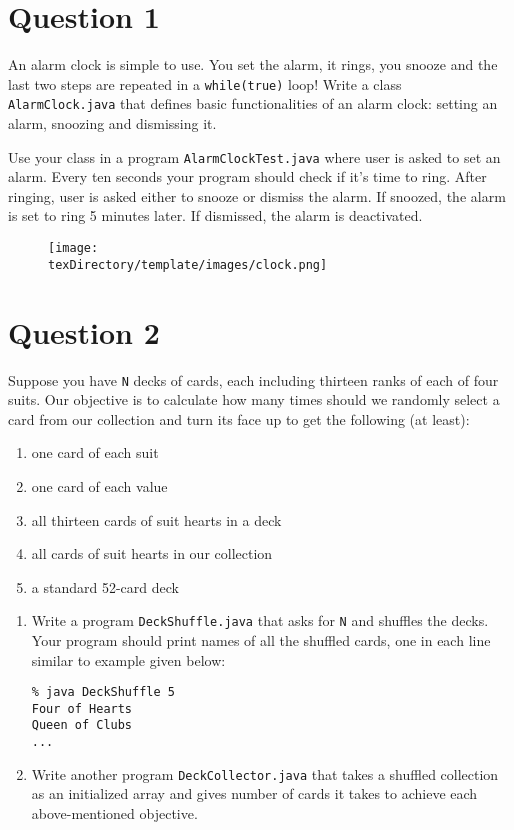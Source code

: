 \documentclass[12pt,letterpaper,twoside]{article}
\begin{document}


\section*{Question 1}

An alarm clock is simple to use.
You set the alarm, it rings, you snooze and the last two steps are repeated in a \texttt{while(true)} loop! Write a class \texttt{AlarmClock.java} that defines basic functionalities of an alarm clock: setting an alarm, snoozing and dismissing it.

Use your class in a program \texttt{AlarmClockTest.java} where user is asked to set an alarm.
Every ten seconds your program should check if it's time to ring.
After ringing, user is asked either to snooze or dismiss the alarm.
If snoozed, the alarm is set to ring 5 minutes later.
If dismissed, the alarm is deactivated.

\begin{figure}[H]\centering
\texttt{[image: \\texDirectory/template/images/clock.png]}
\end{figure}
\newpage

\section*{Question 2}

Suppose you have \texttt{N} decks of cards, each including thirteen ranks of each of four suits. Our objective is to calculate how many times should we randomly select a card from our collection and turn its face up to get the following (at least):
\begin{enumerate}[itemsep=0mm,label=(\alph*)]
\item one card of each suit
\item one card of each value
\item all thirteen cards of suit hearts in a deck
\item all cards of suit hearts in our collection
\item a standard 52-card deck
\end{enumerate}

\begin{enumerate}
\item Write a program \texttt{DeckShuffle.java} that asks for \texttt{N} and shuffles the decks. Your program should print names of all the shuffled cards, one in each line similar to example given below:
\begin{verbatim}
% java DeckShuffle 5
Four of Hearts
Queen of Clubs
...
\end{verbatim}
\item Write another program \texttt{DeckCollector.java} that takes a shuffled collection as an initialized array and gives number of cards it takes to achieve each above-mentioned objective.
\end{enumerate}
\end{document}

